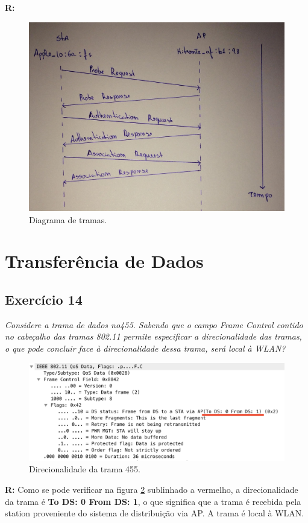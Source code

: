 \documentclass{llncs}
\begin{document}
\textbf{R:}
\begin{figure}[H]
\begin{center}
\includegraphics[scale=0.15]{13.png} 
\end{center}
\caption{\label{fig:13}Diagrama de tramas.}
\end{figure} 


\section{Transferência de Dados}

\subsection{Exercício 14}
\emph{Considere a trama de dados no455. Sabendo que o campo Frame Control contido no cabeçalho das tramas 802.11 permite especificar a direcionalidade das tramas, o que pode concluir face à direcionalidade dessa trama, será local à WLAN?}
\begin{figure}[H]
\begin{center}
\includegraphics[scale=0.30]{14.png} 
\end{center}
\caption{\label{fig:14}Direcionalidade da trama 455.}
\end{figure} 
\par
\textbf{R:} Como se pode verificar na figura \ref{fig:14} sublinhado a vermelho, a direcionalidade da trama é \textbf{To DS: 0 From DS: 1}, o que significa que a trama é recebida pela station proveniente do sistema de distribuição via AP. A trama é local à WLAN.
\end{document}
